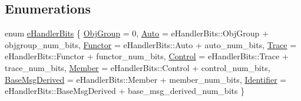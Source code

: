 \subsection*{Enumerations}
\begin{DoxyCompactItemize}
\item 
enum \hyperlink{namespacevt_af182285b57b225b163d5d8aff03cb8c2}{e\+Handler\+Bits} \{ \newline
\hyperlink{namespacevt_af182285b57b225b163d5d8aff03cb8c2ad0350d799a68d110696009c434e5b701}{Obj\+Group} = 0, 
\hyperlink{namespacevt_af182285b57b225b163d5d8aff03cb8c2abfa992da505171200949c7e580e84ea2}{Auto} = e\+Handler\+Bits\+:\+:Obj\+Group + objgroup\+\_\+num\+\_\+bits, 
\hyperlink{namespacevt_af182285b57b225b163d5d8aff03cb8c2ac61e9f48e514369f0eb8ac5cebf9fb14}{Functor} = e\+Handler\+Bits\+:\+:Auto + auto\+\_\+num\+\_\+bits, 
\hyperlink{namespacevt_af182285b57b225b163d5d8aff03cb8c2aee391b103987f3eb488e081ecc1fc5e8}{Trace} = e\+Handler\+Bits\+:\+:Functor + functor\+\_\+num\+\_\+bits, 
\newline
\hyperlink{namespacevt_af182285b57b225b163d5d8aff03cb8c2a3e3fe7a58187c2288f3c2177be08d4d5}{Control} = e\+Handler\+Bits\+:\+:Trace + trace\+\_\+num\+\_\+bits, 
\hyperlink{namespacevt_af182285b57b225b163d5d8aff03cb8c2a4e2cf24ac4752089ddca27fb7e8a43f8}{Member} = e\+Handler\+Bits\+:\+:Control + control\+\_\+num\+\_\+bits, 
\hyperlink{namespacevt_af182285b57b225b163d5d8aff03cb8c2acff3b95c0c9083c01b66480d93ef1209}{Base\+Msg\+Derived} = e\+Handler\+Bits\+:\+:Member + member\+\_\+num\+\_\+bits, 
\hyperlink{namespacevt_af182285b57b225b163d5d8aff03cb8c2a4f58efa47c6cfd117a011be7820d1d8a}{Identifier} = e\+Handler\+Bits\+:\+:Base\+Msg\+Derived + base\+\_\+msg\+\_\+derived\+\_\+num\+\_\+bits
 \}
\end{DoxyCompactItemize}
